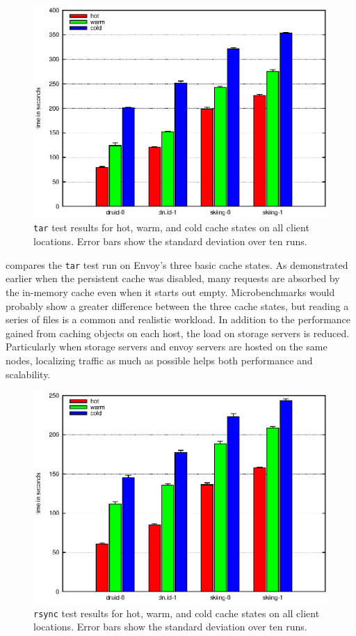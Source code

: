 \begin{figure}[t]
\centering
\includegraphics[width=\figwidth]{figures/envoy-tar}
\caption[The \texttt{tar} test with all cache modes]{\texttt{tar} test results for hot, warm, and cold cache states on all client locations. Error bars show the standard deviation over ten runs.}
\label{fig:envoy-tar}
\end{figure}

 compares the \texttt{tar} test run on Envoy's three basic cache states. As demonstrated earlier when the persistent cache was disabled, many requests are absorbed by the in-memory cache even when it starts out empty. Microbenchmarks would probably show a greater difference between the three cache states, but reading a series of files is a common and realistic workload. In addition to the performance gained from caching objects on each host, the load on storage servers is reduced. Particularly when storage servers and envoy servers are hosted on the same nodes, localizing traffic as much as possible helps both performance and scalability.

\begin{figure}[t]
\centering
\includegraphics[width=\figwidth]{figures/envoy-rsync}
\caption[The \texttt{rsync} test with all cache modes]{\texttt{rsync} test results for hot, warm, and cold cache states on all client locations. Error bars show the standard deviation over ten runs.}
\label{fig:envoy-rsync}
\end{figure}

